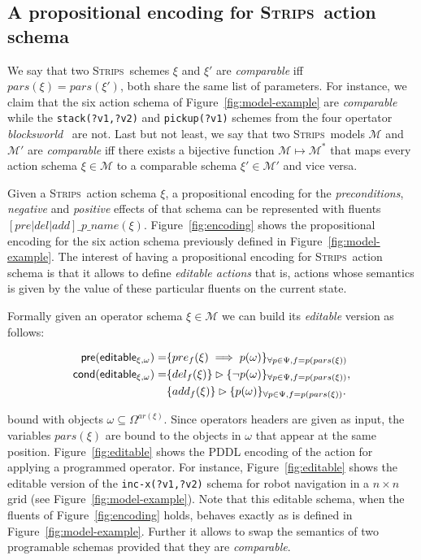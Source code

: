 \documentclass[letterpaper]{article} %
\newcommand{\pre}{\mathsf{pre}}     %
\newcommand{\cond}{\mathsf{cond}}   %
\newcommand{\strips}{\textsc{Strips}}     %
\begin{document}
\subsection{A propositional encoding for \strips\ action schema}
We say that two \strips\ schemes $\xi$ and $\xi'$ are {\em comparable} iff $pars(\xi)=pars(\xi')$, both share the same list of parameters. For instance, we claim that the six action schema of Figure~\ref{fig:model-example} are {\em comparable} while the {\small\tt stack(?v1,?v2)} and {\small\tt pickup(?v1)} schemes from the four opertator {\em blocksworld}~\cite{slaney2001blocks} are not. Last but not least, we say that two \strips\ models $\mathcal{M}$ and $\mathcal{M}'$ are {\em comparable} iff there exists a bijective function $\mathcal{M} \mapsto \mathcal{M}^*$ that maps every action schema $\xi\in\mathcal{M}$ to a comparable schema $\xi'\in\mathcal{M'}$ and vice versa.

Given a \strips\ action schema $\xi$, a propositional encoding for the {\em preconditions}, {\em negative} and {\em positive} effects of that schema can be represented with fluents $[pre|del|add]\_p\_name(\xi)$. Figure~\ref{fig:encoding} shows the propositional encoding for the six action schema previously defined in Figure~\ref{fig:model-example}. The interest of having a propositional encoding for \strips\ action schema is that it allows to define {\em editable actions} that is, actions whose semantics is given by the value of these particular fluents on the current state.

Formally given an operator schema $\xi\in\mathcal{M}$ we can build its {\em editable} version as follows:
\begin{small}
\begin{align*}
\hspace*{7pt}\pre(\mathsf{editable_{\xi,\omega}})=&\{pre_{f}(\xi)\implies p(\omega)\}_{\forall p\in\Psi,f=p(pars(\xi))}\\
\cond(\mathsf{editable_{\xi,\omega}})=&\{del_{f}(\xi)\}\rhd\{\neg p(\omega)\}_{\forall p\in\Psi,f=p(pars(\xi))},\\
&\{add_{f}(\xi)\}\rhd\{p(\omega)\}_{\forall p\in\Psi,f=p(pars(\xi))}.
\end{align*}
\end{small}
bound with objects $\omega\subseteq\Omega^{ar(\xi)}$. Since operators headers are given as input, the variables $pars(\xi)$ are bound to the objects in $\omega$ that appear at the same position. Figure~\ref{fig:editable} shows the PDDL encoding of the action for applying a programmed operator. For instance, Figure~\ref{fig:editable} shows the editable version of the {\tt\small inc-x(?v1,?v2)} schema for robot navigation in a $n\times n$ grid (see Figure~\ref{fig:model-example}). Note that this editable schema, when the fluents of Figure~\ref{fig:encoding} holds, behaves exactly as is defined in Figure~\ref{fig:model-example}. Further it allows to swap the semantics of two programable schemas provided that they are {\em comparable}. 
\end{document}
